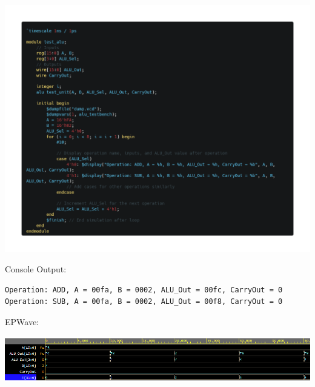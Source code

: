\documentclass[12pt]{article}
\begin{document}
\begin{center}
    \includegraphics[width=\linewidth]{images/alu_tb.png}
\end{center}
Console Output:
\begin{verbatim}
Operation: ADD, A = 00fa, B = 0002, ALU_Out = 00fc, CarryOut = 0
Operation: SUB, A = 00fa, B = 0002, ALU_Out = 00f8, CarryOut = 0
\end{verbatim}
EPWave:
\begin{center}
    \includegraphics[width=\linewidth]{images/alu_tb_wave.png}
\end{center}
\newpage
\end{document}
